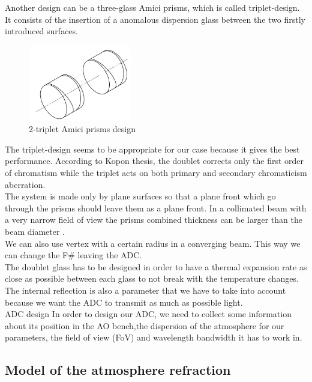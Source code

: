 Another design can be a three-glass Amici prisms, which is called triplet-design. It consists of the insertion of a anomalous dispersion glass between the two firstly introduced surfaces.
\begin{figure}[H]
\centering
	\includegraphics[width = 0.4\textwidth]{images/tripletDesignISO.png}
	\caption{2-triplet Amici prisms design \cite{KCG}}
	\centering
\end{figure}

The triplet-design seems to be appropriate for our case because it gives the best performance. According to Kopon thesis\cite{KCG}, the doublet corrects only the first order of chromatism while the triplet acts on both primary and secondary chromaticism aberration.\\

The system is made only by plane surfaces so that a plane front which go through the prisms should leave them as a plane front. In a collimated beam with a very narrow field of view the prisms combined thickness can be larger than the beam diameter \cite{Wynne1992}.\\
We can also use vertex with a certain radius in a converging beam. This way we can change the F\# leaving the ADC.\\
The doublet glass has to be designed in order to have a thermal expansion rate as close as possible between each glass to not break with the temperature changes. The internal reflection is also a parameter that we have to take into account because we want the ADC to transmit as much as possible light.\\

{ADC design}
In order to design our ADC, we need to collect some information about its position in the AO bench,the dispersion of the atmosphere for our parameters, the field of view (FoV) and wavelength bandwidth it has to work in.

\subsection{Model of the atmosphere refraction}

